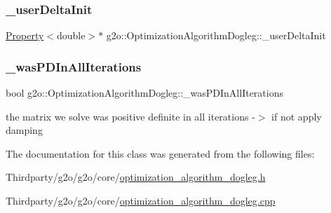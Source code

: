 \subsubsection{\texorpdfstring{\+\_\+user\+Delta\+Init}{\_userDeltaInit}}
{\footnotesize\ttfamily \mbox{\hyperlink{classg2o_1_1_property}{Property}}$<$double$>$$\ast$ g2o\+::\+Optimization\+Algorithm\+Dogleg\+::\+\_\+user\+Delta\+Init\hspace{0.3cm}{\ttfamily [protected]}}

\mbox{\label{classg2o_1_1_optimization_algorithm_dogleg_af921ebbebaf059f73e410fc751616ec2}} 
\subsubsection{\texorpdfstring{\+\_\+was\+P\+D\+In\+All\+Iterations}{\_wasPDInAllIterations}}
{\footnotesize\ttfamily bool g2o\+::\+Optimization\+Algorithm\+Dogleg\+::\+\_\+was\+P\+D\+In\+All\+Iterations\hspace{0.3cm}{\ttfamily [protected]}}



the matrix we solve was positive definite in all iterations -\/$>$ if not apply damping 



The documentation for this class was generated from the following files\+:\begin{DoxyCompactItemize}
\item 
Thirdparty/g2o/g2o/core/\mbox{\hyperlink{optimization__algorithm__dogleg_8h}{optimization\+\_\+algorithm\+\_\+dogleg.\+h}}\item 
Thirdparty/g2o/g2o/core/\mbox{\hyperlink{optimization__algorithm__dogleg_8cpp}{optimization\+\_\+algorithm\+\_\+dogleg.\+cpp}}\end{DoxyCompactItemize}
